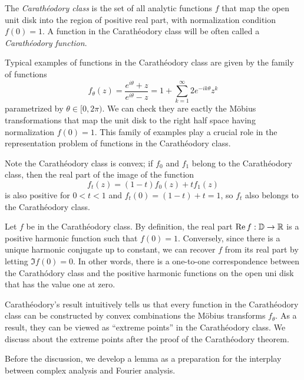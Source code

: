 \documentclass[12pt]{article}
\begin{document}
\begin{defn}
The \emph{Carath\'eodory class} is the set of all analytic functions $f$ that map the open unit disk into the region of positive real part, with normalization condition $f(0)=1$.
A function in the Carath\'eodory class will be often called a \emph{Carath\'eodory function}.
\end{defn}

\begin{ex}
Typical examples of functions in the Carath\'eodory class are given by the family of functions
\[f_\theta(z)=\frac{e^{i\theta}+z}{e^{i\theta}-z}=1+\sum_{k=1}^\infty2e^{-ik\theta}z^k\]
parametrized by $\theta\in[0,2\pi)$.
We can check they are eactly the M\"obius transformations that map the unit disk to the right half space having normalization $f(0)=1$.
This family of examples play a crucial role in the representation problem of functions in the Carath\'eodory class.
\end{ex}

\begin{ex}
Note the Carath\'eodory class is convex; if $f_0$ and $f_1$ belong to the Carath\'eodory class, then the real part of the image of the function
\[f_t(z)=(1-t)f_0(z)+tf_1(z)\]
is also positive for $0<t<1$ and $f_t(0)=(1-t)+t=1$, so $f_t$ also belongs to the Carath\'eodory class.
\end{ex}

\begin{ex}
Let $f$ be in the Carath\'eodory class.
By definition, the real part $\operatorname{Re} f:\mathbb{D}\to\mathbb{R}$ is a positive harmonic function such that $f(0)=1$.
Conversely, since there is a unique harmonic conjugate up to constant, we can recover $f$ from its real part by letting $\Im f(0)=0$.
In other words, there is a one-to-one correspondence between the Carath\'odory class and the positive harmonic functions on the open uni disk that has the value one at zero.
\end{ex}

Carath\'eodory's result intuitively tells us that every function in the Carath\'eodory class can be constructed by convex combinations the M\"obius transforms $f_\theta$.
As a result, they can be viewed as ``extreme points'' in the Carath\'eodory class.
We discuss about the extreme points after the proof of the Carath\'eodory theorem.

Before the discussion, we develop a lemma as a preparation for the interplay between complex analysis and Fourier analysis.
\end{document}
